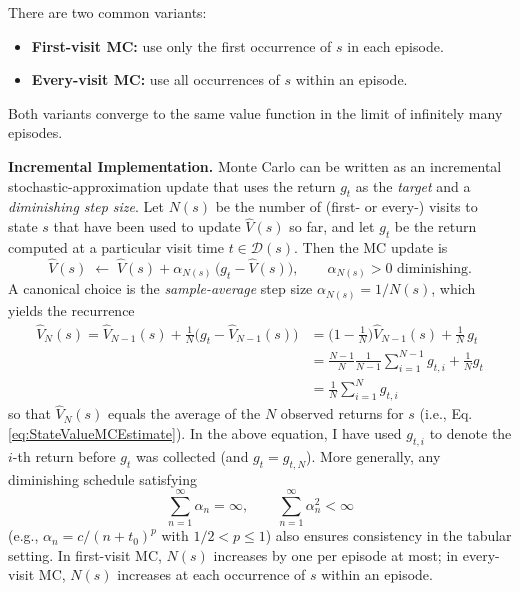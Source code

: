 \documentclass[
]{book}
\providecommand{\tightlist}{%
  \setlength{\itemsep}{0pt}\setlength{\parskip}{0pt}}
\theoremstyle{definition}
\theoremstyle{definition}
\theoremstyle{definition}
\theoremstyle{definition}
\theoremstyle{remark}
\begin{document}
There are two common variants:

\begin{itemize}
\tightlist
\item
  \textbf{First-visit MC:} use only the first occurrence of \(s\) in each episode.\\
\item
  \textbf{Every-visit MC:} use all occurrences of \(s\) within an episode.
\end{itemize}

Both variants converge to the same value function in the limit of infinitely many episodes.

\textbf{Incremental Implementation.} Monte Carlo can be written as an incremental stochastic-approximation update that uses the return \(g_t\) as the \emph{target} and a \emph{diminishing step size}. Let \(N(s)\) be the number of (first- or every-) visits to state \(s\) that have been used to update \(\hat V(s)\) so far, and let \(g_t\) be the return computed at a particular visit time \(t\in\mathcal{D}(s)\). Then the MC update is
\begin{equation}
\hat V(s) \;\leftarrow\; \hat V(s) + \alpha_{N(s)}\,\big( g_t - \hat V(s) \big),
\qquad \alpha_{N(s)} > 0 \text{ diminishing.}
\label{eq:mc-incremental}
\end{equation}
A canonical choice is the \emph{sample-average} step size \(\alpha_{N(s)} = 1/N(s)\), which yields the recurrence
\begin{align}
\hat V_{N}(s) = \hat V_{N-1}(s) + \tfrac{1}{N}\big(g_t - \hat V_{N-1}(s)\big)
& = \Big(1-\tfrac{1}{N}\Big)\hat V_{N-1}(s) + \tfrac{1}{N}\, g_t \\
& = \frac{N-1}{N} \frac{1}{N-1} \sum_{i=1}^{N-1} g_{t,i} + \frac{1}{N} g_t \\
& = \frac{1}{N} \sum_{i=1}^N g_{t,i}
\end{align}
so that \(\hat V_{N}(s)\) equals the average of the \(N\) observed returns for \(s\) (i.e., Eq. \eqref{eq:StateValueMCEstimate}). In the above equation, I have used \(g_{t,i}\) to denote the \(i\)-th return before \(g_t\) was collected (and \(g_t = g_{t,N}\)). More generally, any diminishing schedule satisfying
\[
\sum_{n=1}^\infty \alpha_n = \infty, \qquad \sum_{n=1}^\infty \alpha_n^2 < \infty
\]
(e.g., \(\alpha_n = c/(n+t_0)^p\) with \(1/2 < p \le 1\)) also ensures consistency in the tabular setting. In first-visit MC, \(N(s)\) increases by one per episode at most; in every-visit MC, \(N(s)\) increases at each occurrence of \(s\) within an episode.
\end{document}
